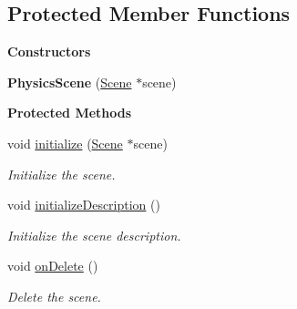 \subsection*{Protected Member Functions}
\begin{Indent}\textbf{ Constructors}\par
\begin{DoxyCompactItemize}
\item 
\mbox{\label{classrev_1_1_physics_scene_a6c40d2f023047568123322a51c86f8e8}} 
{\bfseries Physics\+Scene} (\mbox{\hyperlink{classrev_1_1_scene}{Scene}} $\ast$scene)
\end{DoxyCompactItemize}
\end{Indent}
\begin{Indent}\textbf{ Protected Methods}\par
\begin{DoxyCompactItemize}
\item 
\mbox{\label{classrev_1_1_physics_scene_adff43e54b6e4f510dc76478e74abedbe}} 
void \mbox{\hyperlink{classrev_1_1_physics_scene_adff43e54b6e4f510dc76478e74abedbe}{initialize}} (\mbox{\hyperlink{classrev_1_1_scene}{Scene}} $\ast$scene)
\begin{DoxyCompactList}\small\item\em Initialize the scene. \end{DoxyCompactList}\item 
\mbox{\label{classrev_1_1_physics_scene_a9c455866a0e6759abe45a34c120072e1}} 
void \mbox{\hyperlink{classrev_1_1_physics_scene_a9c455866a0e6759abe45a34c120072e1}{initialize\+Description}} ()
\begin{DoxyCompactList}\small\item\em Initialize the scene description. \end{DoxyCompactList}\item 
\mbox{\label{classrev_1_1_physics_scene_a0bd646e5b9227f17a9e4bf057cec7d5a}} 
void \mbox{\hyperlink{classrev_1_1_physics_scene_a0bd646e5b9227f17a9e4bf057cec7d5a}{on\+Delete}} ()
\begin{DoxyCompactList}\small\item\em Delete the scene. \end{DoxyCompactList}\end{DoxyCompactItemize}
\end{Indent}
